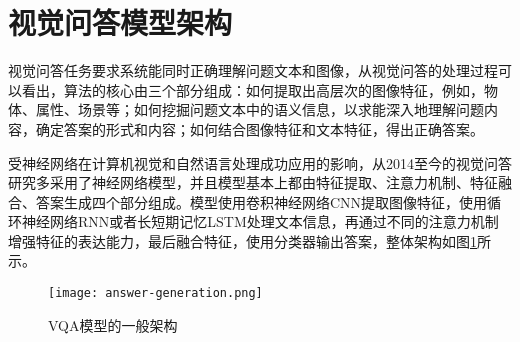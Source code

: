 
\section{视觉问答模型架构}
视觉问答任务要求系统能同时正确理解问题文本和图像，从视觉问答的处理过程可以看出，算法的核心由三个部分组成：如何提取出高层次的图像特征，例如，物体、属性、场景等；如何挖掘问题文本中的语义信息，以求能深入地理解问题内容，确定答案的形式和内容；如何结合图像特征和文本特征，得出正确答案。

受神经网络在计算机视觉和自然语言处理成功应用的影响，从2014至今的视觉问答研究多采用了神经网络模型，并且模型基本上都由特征提取、注意力机制、特征融合、答案生成四个部分组成。模型使用卷积神经网络CNN提取图像特征，使用循环神经网络RNN或者长短期记忆LSTM处理文本信息，再通过不同的注意力机制增强特征的表达能力，最后融合特征，使用分类器输出答案，整体架构如图\ref{answer-generation}所示。
\begin{figure}[H]
	\centering
	\texttt{[image: answer-generation.png]}
	\caption{VQA模型的一般架构}
	\label{answer-generation}
\end{figure}




